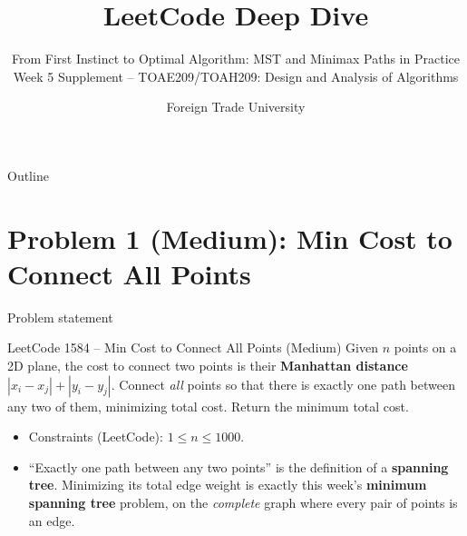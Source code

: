 \documentclass[11pt,aspectratio=169]{beamer}
\title{LeetCode Deep Dive}
\subtitle{From First Instinct to Optimal Algorithm: MST and Minimax Paths in Practice\\
\small Week 5 Supplement -- TOAE209/TOAH209: Design and Analysis of Algorithms}
\author{Foreign Trade University}
\date{}
\begin{document}
\begin{frame}
  \titlepage
\end{frame}

\begin{frame}{Outline}
  \tableofcontents
\end{frame}

\section{Problem 1 (Medium): Min Cost to Connect All Points}

\begin{frame}{Problem statement}
  \begin{block}{LeetCode 1584 -- Min Cost to Connect All Points (\textcolor{blue!50!black}{Medium})}
    Given $n$ points on a 2D plane, the cost to connect two points is their
    \textbf{Manhattan distance} $|x_i-x_j|+|y_i-y_j|$. Connect \emph{all} points
    so that there is exactly one path between any two of them, minimizing total
    cost. Return the minimum total cost.
  \end{block}
  \begin{itemize}
    \item Constraints (LeetCode): $1 \le n \le 1000$.
    \item ``Exactly one path between any two points'' is the definition of a
    \textbf{spanning tree}. Minimizing its total edge weight is exactly this
    week's \textbf{minimum spanning tree} problem, on the \emph{complete} graph
    where every pair of points is an edge.
  \end{itemize}
\end{frame}
\end{document}
